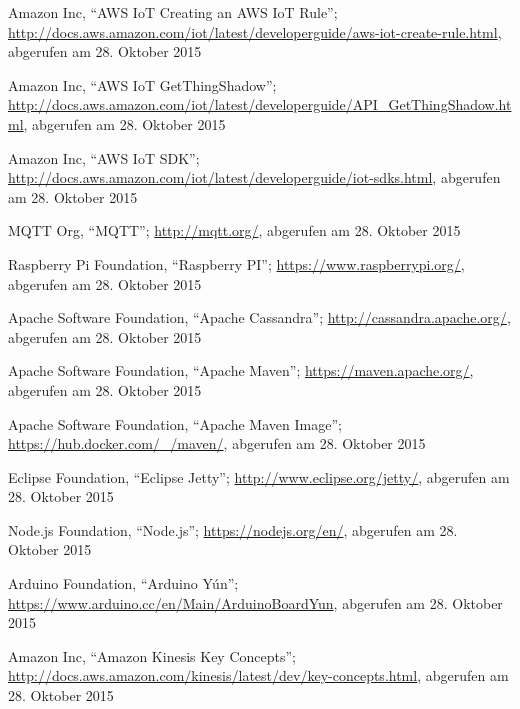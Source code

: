 \begin{thebibliography}{1}
Amazon Inc, ``AWS IoT Creating an AWS IoT Rule''; \url{http://docs.aws.amazon.com/iot/latest/developerguide/aws-iot-create-rule.html}, abgerufen am 28. Oktober 2015

Amazon Inc, ``AWS IoT GetThingShadow''; \url{http://docs.aws.amazon.com/iot/latest/developerguide/API_GetThingShadow.html}, abgerufen am 28. Oktober 2015

Amazon Inc, ``AWS IoT SDK''; \url{http://docs.aws.amazon.com/iot/latest/developerguide/iot-sdks.html}, abgerufen am 28. Oktober 2015

MQTT Org, ``MQTT''; \url{http://mqtt.org/}, abgerufen am 28. Oktober 2015

Raspberry Pi Foundation, ``Raspberry PI''; \url{https://www.raspberrypi.org/}, abgerufen am 28. Oktober 2015

Apache Software Foundation, ``Apache Cassandra''; \url{http://cassandra.apache.org/}, abgerufen am 28. Oktober 2015

Apache Software Foundation, ``Apache Maven''; \url{https://maven.apache.org/}, abgerufen am 28. Oktober 2015

Apache Software Foundation, ``Apache Maven Image''; \url{https://hub.docker.com/_/maven/}, abgerufen am 28. Oktober 2015

Eclipse Foundation, ``Eclipse Jetty''; \url{http://www.eclipse.org/jetty/}, abgerufen am 28. Oktober 2015

Node.js Foundation, ``Node.js''; \url{https://nodejs.org/en/}, abgerufen am 28. Oktober 2015

Arduino Foundation, ``Arduino Yún''; \url{https://www.arduino.cc/en/Main/ArduinoBoardYun}, abgerufen am 28. Oktober 2015

Amazon Inc, ``Amazon Kinesis Key Concepts'';  \url{http://docs.aws.amazon.com/kinesis/latest/dev/key-concepts.html}, abgerufen am 28. Oktober 2015

\end{thebibliography}